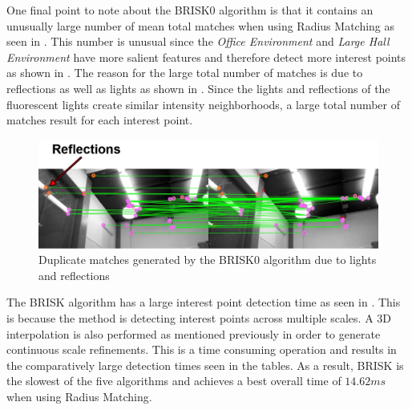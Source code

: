 One final point to note about the BRISK0 algorithm is that it contains an unusually large number of mean total matches when using Radius Matching as seen in . This number is unusual since the \textit{Office Environment} and \textit{Large Hall Environment} have more salient features and therefore detect more interest points as shown in . The reason for the large total number of matches is due to reflections as well as lights as shown in . Since the lights and reflections of the fluorescent lights create similar intensity neighborhoods, a large total number of matches result for each interest point.\\

\begin{figure}
  \centering
    \includegraphics[width=1.0\textwidth]{../Drawings/Matching/reflectionsBrisk0_photo.jpg}
    \caption{Duplicate matches generated by the BRISK0 algorithm due to lights and reflections} 
    \label{fig:reflectionsBrisk0}
\end{figure}


The BRISK algorithm has a large interest point detection time as seen in . This is because the method is detecting interest points across multiple scales. A 3D interpolation is also performed as mentioned previously in order to generate continuous scale refinements. This is a time consuming operation and results in the comparatively large detection times seen in the tables. As a result, BRISK is the slowest of the five algorithms and achieves a best overall time of $14.62 ms$ when using Radius Matching.\\


